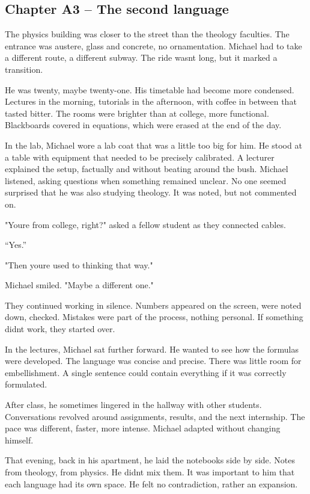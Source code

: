 \documentclass[
]{article}
\begin{document}
\subsection{Chapter A3 -- The second language}\label{chapter-a3-the-second-language}

The physics building was closer to the street than the theology faculties. The entrance was austere, glass and concrete, no ornamentation. Michael had to take a different route, a different subway. The ride wasn\textquotesingle t long, but it marked a transition.

He was twenty, maybe twenty-one. His timetable had become more condensed. Lectures in the morning, tutorials in the afternoon, with coffee in between that tasted bitter. The rooms were brighter than at college, more functional. Blackboards covered in equations, which were erased at the end of the day.

In the lab, Michael wore a lab coat that was a little too big for him. He stood at a table with equipment that needed to be precisely calibrated. A lecturer explained the setup, factually and without beating around the bush. Michael listened, asking questions when something remained unclear. No one seemed surprised that he was also studying theology. It was noted, but not commented on.

"You\textquotesingle re from college, right?" asked a fellow student as they connected cables.

``Yes.''

"Then you\textquotesingle re used to thinking that way."

Michael smiled. "Maybe a different one."

They continued working in silence. Numbers appeared on the screen, were noted down, checked. Mistakes were part of the process, nothing personal. If something didn\textquotesingle t work, they started over.

In the lectures, Michael sat further forward. He wanted to see how the formulas were developed. The language was concise and precise. There was little room for embellishment. A single sentence could contain everything if it was correctly formulated.

After class, he sometimes lingered in the hallway with other students. Conversations revolved around assignments, results, and the next internship. The pace was different, faster, more intense. Michael adapted without changing himself.

That evening, back in his apartment, he laid the notebooks side by side. Notes from theology, from physics. He didn\textquotesingle t mix them. It was important to him that each language had its own space. He felt no contradiction, rather an expansion.
\end{document}
